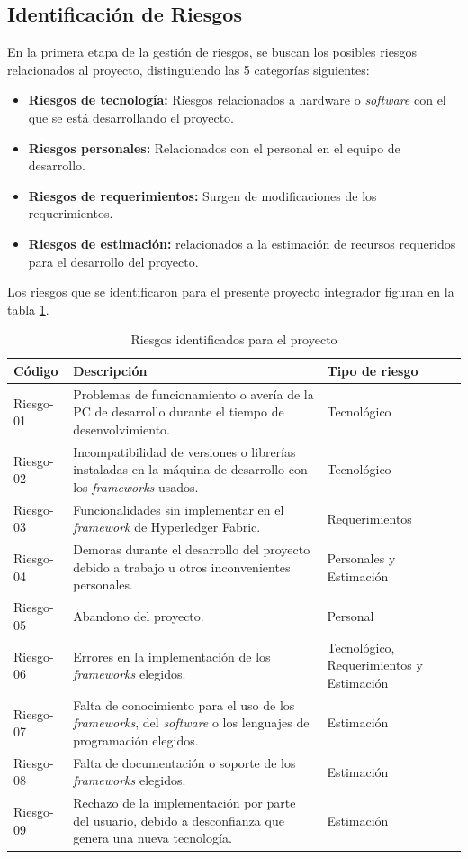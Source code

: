 \subsection{Identificación de Riesgos}
En la primera etapa de la gestión de riesgos, se buscan los posibles riesgos relacionados al proyecto, distinguiendo las 5 categorías siguientes:
\begin{itemize}
    \item \textbf{Riesgos de tecnología:} Riesgos relacionados a hardware o \textit{software} con el que se está desarrollando el proyecto.
    \item \textbf{Riesgos personales:} Relacionados con el personal en el equipo de desarrollo.
    \item \textbf{Riesgos de requerimientos:} Surgen de modificaciones de los requerimientos.
    \item \textbf{Riesgos de estimación:} relacionados a la estimación de recursos requeridos para el desarrollo del proyecto.
\end{itemize}
Los riesgos que se identificaron para el presente proyecto integrador figuran en la tabla \ref{identification_risks}.
\begin{table}[h]
    \begin{tabular}{|m{2cm}|m{7.5cm}|m{3.5cm}|}
    \hline
    \textbf{Código} & \textbf{Descripción} & \textbf{Tipo de riesgo}\\
    \hline
    Riesgo-01 & Problemas de funcionamiento o avería de la PC de desarrollo durante el tiempo de desenvolvimiento. & Tecnológico\\
    \hline
    Riesgo-02 & Incompatibilidad de versiones o librerías instaladas en la máquina de desarrollo con los \textit{frameworks} usados. & Tecnológico \\
    \hline
    Riesgo-03 & Funcionalidades sin implementar en el \textit{framework} de Hyperledger Fabric. & Requerimientos\\
    \hline
    Riesgo-04 & Demoras durante el desarrollo del proyecto debido a trabajo u otros inconvenientes personales. & Personales y Estimación \\
    \hline
    Riesgo-05 & Abandono del proyecto. & Personal \\
    \hline
    Riesgo-06 & Errores en la implementación de los \textit{frameworks} elegidos. & Tecnológico, Requerimientos y Estimación\\
    \hline
    Riesgo-07 & Falta de conocimiento para el uso de los \textit{frameworks}, del \textit{software} o los lenguajes de programación elegidos. & Estimación \\
    \hline
    Riesgo-08 & Falta de documentación o soporte de los \textit{frameworks} elegidos. & Estimación \\
    \hline
    Riesgo-09 & Rechazo de la implementación por parte del usuario, debido a desconfianza que genera una nueva tecnología. & Estimación \\
    \hline 
    \end{tabular}
    \caption{Riesgos identificados para el proyecto}
\label{identification_risks}
\end{table}

